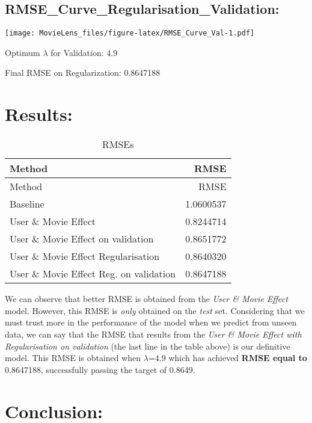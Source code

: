 \documentclass[
]{article}
\newenvironment{Shaded}{\begin{snugshade}}{\end{snugshade}}
\newcommand{\DataTypeTok}[1]{\textcolor[rgb]{0.13,0.29,0.53}{#1}}
\newcommand{\KeywordTok}[1]{\textcolor[rgb]{0.13,0.29,0.53}{\textbf{#1}}}
\newcommand{\NormalTok}[1]{#1}
\newcommand{\OperatorTok}[1]{\textcolor[rgb]{0.81,0.36,0.00}{\textbf{#1}}}
\begin{document}
\begin{Shaded}
\begin{Highlighting}[]
{{{{{{{{{  \KeywordTok{return}\NormalTok{(}\KeywordTok{RMSE}\NormalTok{(predicted_val_reg, validation}\OperatorTok{$}\NormalTok{rating, }\DataTypeTok{na.rm =}\NormalTok{ T))}
\NormalTok{\})}
\end{Highlighting}
\end{Shaded}

\hypertarget{rmse_curve_regularisation_validation}{%
\subsection{\texorpdfstring{\textbf{RMSE\_Curve\_Regularisation\_Validation:}}{RMSE\_Curve\_Regularisation\_Validation:}}\label{rmse_curve_regularisation_validation}}

\texttt{[image: MovieLens\_files/figure-latex/RMSE\_Curve\_Val-1.pdf]}

Optimum \(\lambda\) for Validation: 4.9

Final RMSE on Regularization: 0.8647188\\
\newpage

\hypertarget{results}{%
\section{\texorpdfstring{\textbf{Results:}}{Results:}}\label{results}}

\begin{longtable}[]{@{}lr@{}}
\caption{RMSEs}\tabularnewline
\toprule
Method & RMSE\tabularnewline
\midrule
\endfirsthead
\toprule
Method & RMSE\tabularnewline
\midrule
\endhead
Baseline & 1.0600537\tabularnewline
User \& Movie Effect & 0.8244714\tabularnewline
User \& Movie Effect on validation & 0.8651772\tabularnewline
User \& Movie Effect Regularisation & 0.8640320\tabularnewline
User \& Movie Effect Reg. on validation & 0.8647188\tabularnewline
\bottomrule
\end{longtable}

We can observe that better RMSE is obtained from the \emph{User \& Movie
Effect} model. However, this RMSE is \emph{only} obtained on the
\emph{test} set. Considering that we must trust more in the performance
of the model when we predict from unseen data, we can say that the RMSE
that results from the \emph{User \& Movie Effect with Regularisation on
validation} (the last line in the table above) is our definitive model.
This RMSE is obtained when \(\lambda\)=4.9 which has achieved
\textbf{RMSE equal to} 0.8647188, successfully passing the target of
0.8649.

\hypertarget{conclusion}{%
\section{\texorpdfstring{\textbf{Conclusion:}}{Conclusion:}}\label{conclusion}}
\end{document}
